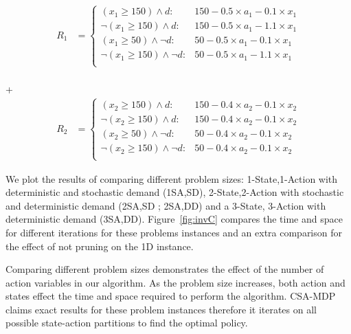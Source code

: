 {\footnotesize
\begin{align*}
R_1 & = \begin{cases}
(x_1 \geq 150) \wedge d :& 150 - 0.5\times a_1 - 0.1\times x_1 \\
\neg(x_1 \geq 150) \wedge d :& 150 - 0.5\times a_1 - 1.1\times x_1 \\
(x_1 \geq 50) \wedge \neg d :& 50 - 0.5\times a_1 - 0.1\times x_1 \\
\neg (x_1 \geq 150) \wedge \neg d :& 50 - 0.5\times a_1 - 1.1\times x_1 \\
\end{cases}
\end{align*}}
\\
+
\\
{\footnotesize
\begin{align*}
R_2 &= \begin{cases}
(x_2 \geq 150) \wedge d :& 150 - 0.4\times a_2 - 0.1\times x_2 \\
\neg(x_2 \geq 150) \wedge d :& 150 - 0.4\times a_2 - 0.1\times x_2 \\
(x_2 \geq 50) \wedge \neg d :& 50 - 0.4\times a_2 - 0.1\times x_2 \\
\neg (x_2 \geq 150) \wedge \neg d :& 50 - 0.4\times a_2 - 0.1\times x_2 \\
\end{cases}
\end{align*}}
 
 
We plot the results of comparing different \InventoryControl problem sizes: 1-State,1-Action with deterministic and stochastic demand (1SA,SD), 2-State,2-Action with stochastic and deterministic demand (2SA,SD ; 2SA,DD) and a 3-State, 3-Action with deterministic demand (3SA,DD). Figure~\ref{fig:invC} compares the time and space
for different iterations for these problems instances and an extra
comparison for the effect of not pruning on the 1D instance. 

Comparing different problem sizes demonstrates the effect of the number of action variables in our algorithm. As the problem size increases, both action and states effect the time and space required to perform the algorithm. CSA-MDP claims exact results for these problem instances therefore it iterates on all possible state-action partitions to find the optimal policy. 

